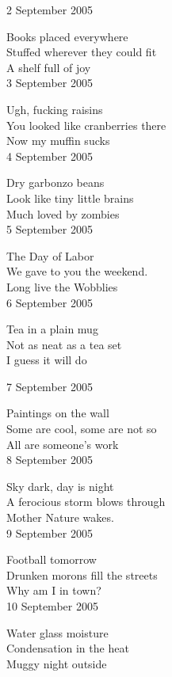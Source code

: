 \documentclass[12pt]{article}
\begin{document}
2 September 2005

Books placed everywhere \\
Stuffed wherever they could fit \\
A shelf full  of joy \\

3 September 2005

Ugh, fucking raisins \\
You looked like cranberries there \\
Now my muffin sucks \\


4 September 2005

Dry garbonzo beans \\
Look like tiny little brains \\
Much loved by zombies \\

5 September 2005

The Day of Labor \\
We gave to you the weekend. \\
Long live the Wobblies \\

6 September 2005

Tea in a plain mug \\
Not as neat as a tea set \\
I guess it will do \\

\newpage

7 September 2005 

Paintings on the wall \\
Some are cool, some are not so \\
All are someone's work \\

8 September 2005

Sky dark, day is night \\
A ferocious storm blows through \\
Mother Nature wakes. \\

9 September 2005

Football tomorrow \\
Drunken morons fill the streets \\
Why am I in town? \\


10 September 2005

Water glass moisture \\
Condensation in the heat \\
Muggy night outside \\
\end{document}
